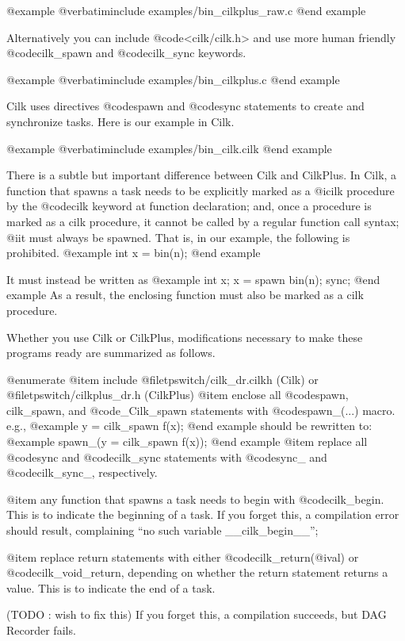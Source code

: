 @example
@verbatiminclude examples/bin_cilkplus_raw.c
@end example

Alternatively you can include @code{<cilk/cilk.h>} and use more human friendly @code{cilk_spawn} and @code{cilk_sync} keywords.

@example
@verbatiminclude examples/bin_cilkplus.c
@end example

Cilk uses directives @code{spawn} and @code{sync} statements to create and synchronize tasks.
Here is our example in Cilk.

@example
@verbatiminclude examples/bin_cilk.cilk
@end example

There is a subtle but important difference between Cilk and CilkPlus.
In Cilk, a function that spawns a task needs to be explicitly marked as
a @i{cilk procedure} by the @code{cilk} keyword at function declaration;
and, once a procedure is marked as a cilk procedure, it cannot be called
by a regular function call syntax; @i{it must always be spawned.}  That is,
in our example, the following is prohibited.
@example
int x = bin(n);
@end example

It must instead be written as
@example
int x;
x = spawn bin(n);
sync;
@end example
As a result, the enclosing function must also be marked as a cilk procedure.


Whether you use Cilk or CilkPlus, modifications necessary to make these
programs ready are summarized as follows.

@enumerate
@item include @file{tpswitch/cilk_dr.cilkh} (Cilk) or @file{tpswitch/cilkplus_dr.h} (CilkPlus)
@item enclose all @code{spawn, cilk_spawn,} and @code{_Cilk_spawn} statements with @code{spawn_(...)} macro.  e.g.,
@example
y = cilk_spawn f(x);
@end example
should be rewritten to:
@example
spawn_(y = cilk_spawn f(x));
@end example
@item replace all @code{sync} and @code{cilk_sync} statements with @code{sync_} and @code{cilk_sync_}, respectively.

@item any function that spawns a task needs to begin with @code{cilk_begin}.  This is to indicate the beginning of a task.  If you forget this, a compilation error should result, complaining ``no such variable __cilk_begin__'';

@item replace return statements with either @code{cilk_return(@i{val})} or @code{cilk_void_return}, depending on whether the return statement returns a value.  This is to indicate the end of a task.  

      (TODO : wish to fix this) If you forget this, a compilation
      succeeds, but DAG Recorder fails.

